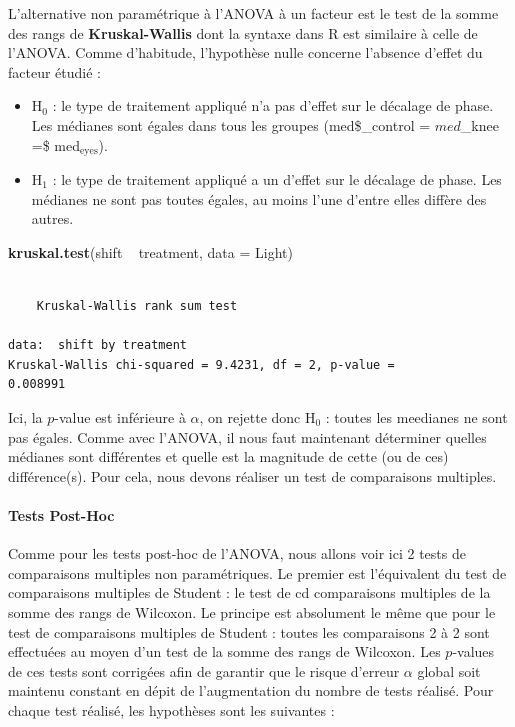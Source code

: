 \documentclass[a4paperpaper,]{article}
\newenvironment{Shaded}{\begin{snugshade}}{\end{snugshade}}
\newcommand{\DataTypeTok}[1]{\textcolor[rgb]{0.00,0.34,0.68}{#1}}
\newcommand{\KeywordTok}[1]{\textcolor[rgb]{0.12,0.11,0.11}{\textbf{#1}}}
\newcommand{\NormalTok}[1]{\textcolor[rgb]{0.12,0.11,0.11}{#1}}
\newcommand{\OperatorTok}[1]{\textcolor[rgb]{0.12,0.11,0.11}{#1}}
\newcommand{\StringTok}[1]{\textcolor[rgb]{0.75,0.01,0.01}{#1}}
\providecommand{\tightlist}{%
  \setlength{\itemsep}{0pt}\setlength{\parskip}{0pt}}
\let\oldparagraph\paragraph
\renewcommand{\paragraph}[1]{\oldparagraph{#1}\mbox{}}
\begin{document}
L'alternative non paramétrique à l'ANOVA à un facteur est le test de la somme des rangs de \textbf{Kruskal-Wallis} dont la syntaxe dans R est similaire à celle de l'ANOVA. Comme d'habitude, l'hypothèse nulle concerne l'absence d'effet du facteur étudié :

\begin{itemize}
\tightlist
\item
  H\(_0\) : le type de traitement appliqué n'a pas d'effet sur le décalage de phase. Les médianes sont égales dans tous les groupes (med\$\_\textrm{control} = \(med\)\_\textrm{knee} =\$ med\(_\textrm{eyes}\)).
\item
  H\(_1\) : le type de traitement appliqué a un d'effet sur le décalage de phase. Les médianes ne sont pas toutes égales, au moins l'une d'entre elles diffère des autres.
\end{itemize}

\begin{Shaded}
\begin{Highlighting}[]
\KeywordTok{kruskal.test}\NormalTok{(shift }\OperatorTok{~}\StringTok{ }\NormalTok{treatment, }\DataTypeTok{data =}\NormalTok{ Light)}
\end{Highlighting}
\end{Shaded}

\begin{verbatim}

    Kruskal-Wallis rank sum test

data:  shift by treatment
Kruskal-Wallis chi-squared = 9.4231, df = 2, p-value =
0.008991
\end{verbatim}

Ici, la \(p\)-value est inférieure à \(\alpha\), on rejette donc H\(_0\) : toutes les meedianes ne sont pas égales. Comme avec l'ANOVA, il nous faut maintenant déterminer quelles médianes sont différentes et quelle est la magnitude de cette (ou de ces) différence(s). Pour cela, nous devons réaliser un test de comparaisons multiples.

\hypertarget{tests-post-hoc-1}{%
\paragraph{Tests Post-Hoc}\label{tests-post-hoc-1}}

Comme pour les tests post-hoc de l'ANOVA, nous allons voir ici 2 tests de comparaisons multiples non paramétriques. Le premier est l'équivalent du test de comparaisons multiples de Student : le test de cd comparaisons multiples de la somme des rangs de Wilcoxon. Le principe est absolument le même que pour le test de comparaisons multiples de Student : toutes les comparaisons 2 à 2 sont effectuées au moyen d'un test de la somme des rangs de Wilcoxon. Les \(p\)-values de ces tests sont corrigées afin de garantir que le risque d'erreur \(\alpha\) global soit maintenu constant en dépit de l'augmentation du nombre de tests réalisé. Pour chaque test réalisé, les hypothèses sont les suivantes :
\end{document}
